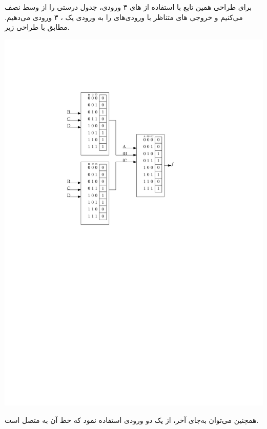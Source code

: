 \begin{qsolve}
	برای طراحی همین تابع با استفاده از  های ۳ ورودی، جدول درستی را از وسط نصف می‌کنیم و خروجی های متناظر با ورودی‌های  را به ورودی یک ، ۳ ورودی می‌دهیم. مطابق با طراحی زیر.
	
	\begin{center}
		\includegraphics*[width=0.42\linewidth]{pics/Q3_b.pdf}
	\end{center}
	
	همچنین می‌توان به‌جای  آخر، از یک  دو ورودی استفاده نمود که خط  آن به  متصل است.
	
		
	
\end{qsolve}
